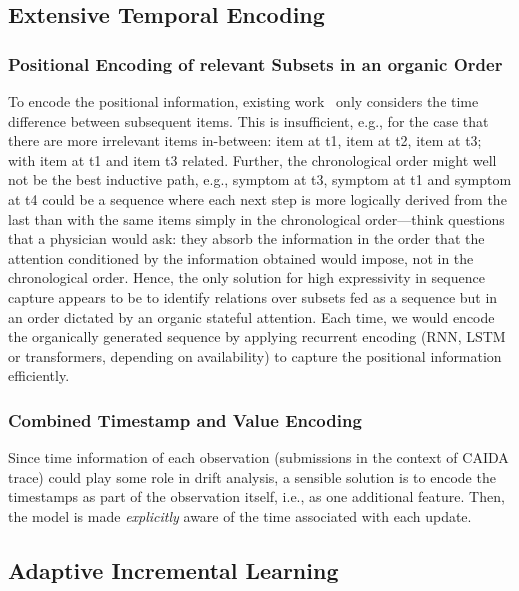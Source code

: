 \subsection{Extensive Temporal Encoding}
\label{sec:extensive_temporal_encoding}

\subsubsection{Positional Encoding of relevant Subsets in an organic Order}

To encode the positional information, existing work~\cite{zhang2020time} only considers the time difference between subsequent items. This is insufficient, e.g., for the case that there are more irrelevant items in-between: item at t1, item at t2, item at t3; with item at t1 and item t3 related. Further, the chronological order might well not be the best inductive path, e.g., symptom at t3, symptom at t1 and symptom at t4 could be a sequence where each next step is more logically derived from the last than with the same items simply in the chronological order---think questions that a physician would ask: they absorb the information in the order that the attention conditioned by the information obtained would impose, not in the chronological order. Hence, the only solution for high expressivity in sequence capture appears to be to identify relations over subsets fed as a sequence but in an order dictated by an organic stateful attention. Each time, we would encode the organically generated sequence by applying recurrent encoding (RNN, LSTM or transformers, depending on availability) to capture the positional information efficiently.

\subsubsection{Combined Timestamp and Value Encoding} \label{sec:timestamp_encoding}

Since time information of each observation (submissions in the context of CAIDA trace) could play some role in drift analysis, a sensible solution is to encode the timestamps as part of the observation itself, i.e., as one additional feature. Then, the model is made \emph{explicitly} aware of the time associated with each update.


\subsection{Adaptive Incremental Learning}
\label{sec:adaptive}

